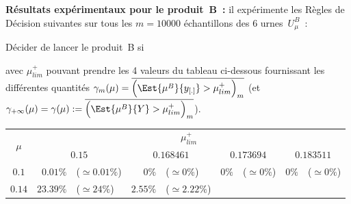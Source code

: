 \documentclass[10pt]{report}
\begin{document}
\begin{exercice}
\noindent \textbf{Résultats expérimentaux pour le produit~B~:}
il expérimente les Règles de Décision suivantes sur tous les $m=10000$ échantillons des 6 urnes~$U^B_\mu$~:
\begin{center}
Décider de lancer le produit~B si 
\end{center} 
avec $\mu^+_{lim}$ pouvant prendre les 4 valeurs du tableau ci-dessous fournissant les différentes quantités $\gamma_m(\mu)=\overline{\Big(\Est{\mu^B}{y_{[.]}}>\mu^+_{lim}\Big)_m}$ (et $\gamma_{+\infty}(\mu)=\gamma(\mu):=\overline{\Big(\Est{\mu^B}{Y}>\mu^+_{lim}\Big)_m}$).
\begin{center}
\begin{tabular}{|c|rl|rl|rl|rl|}\cline{1-9}
        \multirow{2}{*}{$\mu$}
         & 
    \multicolumn{8}{c|}{$\mu^+_{lim}$}
    
    
    
    
    
    
    
    \\ \cline{2-9}

    
        
         & 
    \multicolumn{2}{c|}{$0.15$}
     & 
    \multicolumn{2}{c|}{$0.168461$}
     & 
    \multicolumn{2}{c|}{$0.173694$}
     & 
    \multicolumn{2}{c|}{$0.183511$}
    
    \\ \cline{1-9}

    
        $0.1$
         & 
    
        $0.01\%$
         & 
    
        ($\simeq0.01\%$)
         & 
    
        $0\%$
         & 
    
        ($\simeq0\%$)
         & 
    
        $0\%$
         & 
    
        ($\simeq0\%$)
         & 
    
        $0\%$
         & 
    
        ($\simeq0\%$)
        
    \\ 

    
        $0.14$
         & 
    
        $23.39\%$
         & 
    
        ($\simeq24\%$)
         & 
    
        $2.55\%$
         & 
    
        ($\simeq2.22\%$)
         & 
    

\end{tabular}
\end{center}
\end{exercice}
\end{document}
